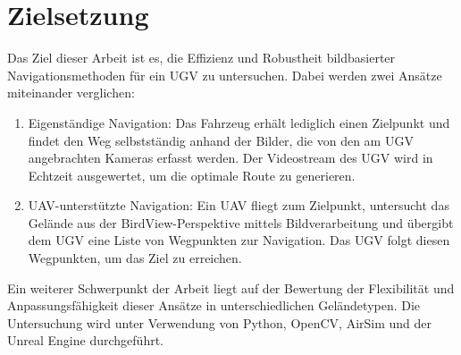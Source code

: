 \section{Zielsetzung}

Das Ziel dieser Arbeit ist es, die Effizienz und Robustheit bildbasierter Navigationsmethoden für ein \ac{UGV} zu untersuchen. Dabei werden zwei Ansätze miteinander verglichen:

\begin{enumerate}
    \item Eigenständige Navigation: 
    Das Fahrzeug erhält lediglich einen Zielpunkt und findet den Weg selbstständig anhand der Bilder, die von den am \ac{UGV} angebrachten Kameras erfasst werden. 
    Der Videostream des \ac{UGV} wird in Echtzeit ausgewertet, um die optimale Route zu generieren.
    \item UAV-unterstützte Navigation: 
    Ein \ac{UAV} fliegt zum Zielpunkt, untersucht das Gelände aus der \gls{BirdView}-Perspektive mittels Bildverarbeitung und übergibt dem \ac{UGV} eine Liste von Wegpunkten zur Navigation. 
    Das \ac{UGV} folgt diesen Wegpunkten, um das Ziel zu erreichen.
\end{enumerate}

Ein weiterer Schwerpunkt der Arbeit liegt auf der Bewertung der Flexibilität und Anpassungsfähigkeit dieser Ansätze in unterschiedlichen Geländetypen. 
Die Untersuchung wird unter Verwendung von Python, \gls{OpenCV}, \gls{AirSim} und der \gls{Unreal Engine} durchgeführt.

